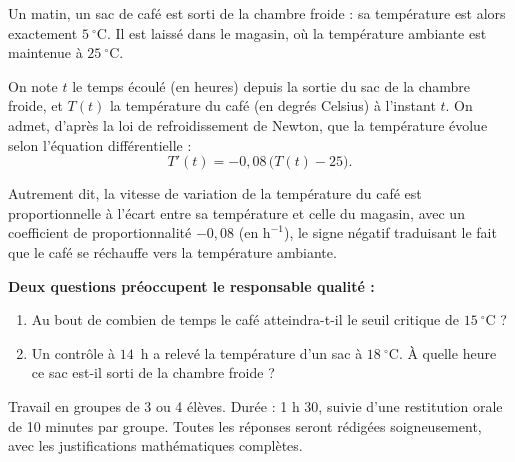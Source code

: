 \documentclass[11pt]{article}
\newcounter{popsec}
\newcounter{popsub}
\newcommand{\courssub}[1]{%
  \stepcounter{popsub}%
  \par\vspace{9pt}\noindent{\popxbold\fontsize{11.5}{13}\selectfont\color{popink}{\color{poporange}\thepopsec.\thepopsub}\hspace{6pt}#1}\par\nopagebreak\vspace{4pt}
}
\begin{document}
Un matin, un sac de café est sorti de la chambre froide : sa température est alors exactement $5~^\circ\mathrm{C}$. Il est laissé dans le magasin, où la température ambiante est maintenue à $25~^\circ\mathrm{C}$.

On note $t$ le temps écoulé (en heures) depuis la sortie du sac de la chambre froide, et $T(t)$ la température du café (en degrés Celsius) à l'instant $t$. On admet, d'après la loi de refroidissement de Newton, que la température évolue selon l'équation différentielle :
\[ T'(t) = -0{,}08\,\big(T(t) - 25\big). \]

Autrement dit, la vitesse de variation de la température du café est proportionnelle à l'écart entre sa température et celle du magasin, avec un coefficient de proportionnalité $-0{,}08$ (en $\mathrm{h}^{-1}$), le signe négatif traduisant le fait que le café se réchauffe vers la température ambiante.

\textbf{Deux questions préoccupent le responsable qualité :}
\begin{enumerate}
\item Au bout de combien de temps le café atteindra-t-il le seuil critique de $15~^\circ\mathrm{C}$ ?
\item Un contrôle à $14$~h a relevé la température d'un sac à $18~^\circ\mathrm{C}$. À quelle heure ce sac est-il sorti de la chambre froide ?
\end{enumerate}

\courssub{Consignes}

Travail en groupes de 3 ou 4 élèves. Durée : 1 h 30, suivie d'une restitution orale de 10 minutes par groupe. Toutes les réponses seront rédigées soigneusement, avec les justifications mathématiques complètes.
\end{document}

